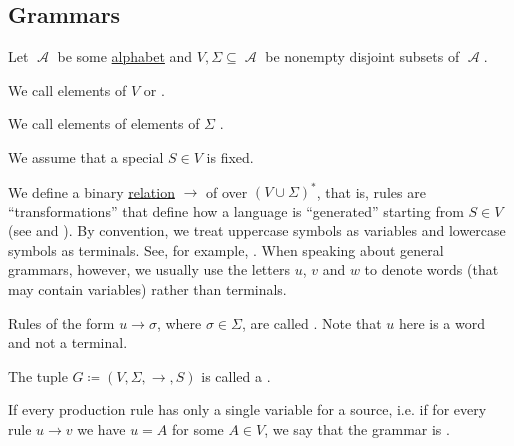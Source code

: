 \subsection{Grammars}\label{subsec:grammars}

\begin{definition}\label{def:grammar}\mcite\cite[def. 2.2]{Sipser2013}
  Let \( \mscrA \) be some \hyperref[def:language/alphabet]{alphabet} and \( V, \Sigma \subseteq \mscrA \) be nonempty disjoint subsets of \( \mscrA \).

  \begin{defenum}
     We call elements of \( V \)  or .

     We call elements of elements of \( \Sigma \) .

     We assume that a special  \( S \in V \) is fixed.

     We define a binary \hyperref[def:relation]{relation} \( \to \) of  over \( (V \cup \Sigma)^* \), that is, rules are \enquote{transformations} that define how a language is \enquote{generated} starting from \( S \in V \) (see  and ). By convention, we treat uppercase symbols as variables and lowercase symbols as terminals. See, for example, . When speaking about general grammars, however, we usually use the letters \( u \), \( v \) and \( w \) to denote words (that may contain variables) rather than terminals.

     Rules of the form \( u \to \sigma \), where \( \sigma \in \Sigma \), are called . Note that \( u \) here is a word and not a terminal.

     The tuple \( G \coloneqq (V, \Sigma, \to, S) \) is called a .

     If every production rule has only a single variable for a source, i.e. if for every rule \( u \to v \) we have \( u = A \) for some \( A \in V \), we say that the grammar is .
  \end{defenum}
\end{definition}

